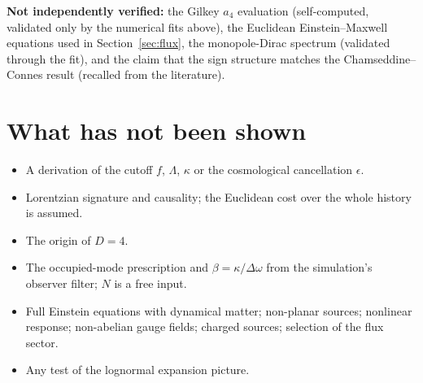 \documentclass[11pt]{article}
\begin{document}
\textbf{Not independently verified:} the Gilkey $a_4$ evaluation (self-computed, validated only by the numerical fits above), the Euclidean Einstein--Maxwell equations
used in Section~\ref{sec:flux}, the monopole-Dirac spectrum (validated through the fit), and the claim that the sign structure matches the Chamseddine--Connes result (recalled from the literature).


\section{What has not been shown}
\label{sec:open}

\begin{itemize}
\item A derivation of the cutoff $f$, $\Lambda$, $\kappa$ or the cosmological cancellation $\epsilon$.
\item Lorentzian signature and causality; the Euclidean cost over the whole history is assumed.
\item The origin of $D=4$.
\item The occupied-mode prescription and $\beta=\kappa/\Delta\omega$ from the simulation's observer filter; $N$ is a free input.
\item Full Einstein equations with dynamical matter; non-planar sources; nonlinear response; non-abelian gauge fields; charged sources; selection of the flux sector.
\item Any test of the lognormal expansion picture.
\end{itemize}
\end{document}
